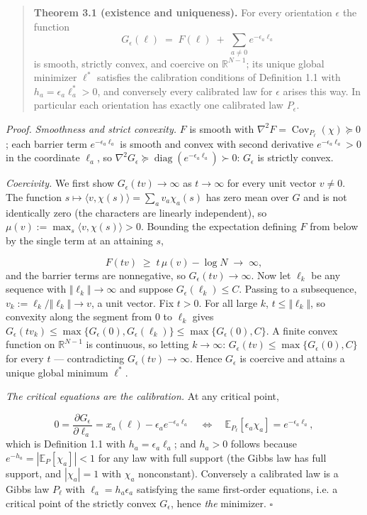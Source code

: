 \documentclass[11pt]{article}
\begin{document}
\begin{quote}
\textbf{Theorem 3.1 (existence and uniqueness).}  For every orientation $\epsilon$ the function
\[
G_\epsilon(\ell) \;=\; F(\ell) \;+\; \sum_{a \ne 0}
e^{-\epsilon_a \ell_a}
\]
is smooth, strictly convex, and coercive on $\mathbb{R}^{N-1}$; its unique global minimizer $\ell^\ast$ satisfies the calibration conditions of Definition 1.1 with $h_a = \epsilon_a\ell^\ast_a > 0$, and conversely every calibrated law for $\epsilon$ arises this way. In particular each orientation has exactly one calibrated law $P_\epsilon$.
\end{quote}
\emph{Proof.}  \emph{Smoothness and strict convexity.}  $F$ is smooth with $\nabla^2 F = \operatorname{Cov}_{P_\ell}(\chi) \succeq 0$; each barrier term $e^{-\epsilon_a\ell_a}$ is smooth and convex with second derivative $e^{-\epsilon_a\ell_a} > 0$ in the coordinate $\ell_a$, so $\nabla^2 G_\epsilon \succeq \operatorname{diag}(e^{-\epsilon_a \ell_a}) \succ 0$: $G_\epsilon$ is strictly convex.

\emph{Coercivity.}  We first show $G_\epsilon(t v) \to \infty$ as $t \to \infty$ for every unit vector $v \ne 0$.  The function $s \mapsto \langle v, \chi(s)\rangle = \sum_a v_a\chi_a(s)$ has zero mean over $G$ and is not identically zero (the characters are linearly independent), so $\mu(v) := \max_s \langle v, \chi(s)\rangle > 0$. Bounding the expectation defining $F$ from below by the single term at an attaining $s$,

\[
F(tv) \;\ge\; t\,\mu(v) - \log N \;\longrightarrow\; \infty ,
\]
and the barrier terms are nonnegative, so $G_\epsilon(tv) \to \infty$.  Now let $\ell_k$ be any sequence with $\Vert\ell_k\Vert \to \infty$ and suppose $G_\epsilon(\ell_k) \le C$.  Passing to a subsequence, $v_k := \ell_k/\Vert\ell_k\Vert \to v$, a unit vector. Fix $t > 0$.  For all large $k$, $t \le \Vert\ell_k\Vert$, so convexity along the segment from $0$ to $\ell_k$ gives $G_\epsilon(t v_k) \le \max\{G_\epsilon(0), G_\epsilon(\ell_k)\} \le \max\{G_\epsilon(0), C\}$.  A finite convex function on $\mathbb{R}^{N-1}$ is continuous, so letting $k \to \infty$: $G_\epsilon(tv) \le \max\{G_\epsilon(0), C\}$ for every $t$ — contradicting $G_\epsilon(tv) \to \infty$.  Hence $G_\epsilon$ is coercive and attains a unique global minimum $\ell^\ast$.

\emph{The critical equations are the calibration.}  At any critical point,

\[
0 = \frac{\partial G_\epsilon}{\partial \ell_a}
= x_a(\ell) - \epsilon_a e^{-\epsilon_a\ell_a}
\quad\Longleftrightarrow\quad
\mathbb{E}_{P_\ell}[\epsilon_a\chi_a] = e^{-\epsilon_a \ell_a} ,
\]
which is Definition 1.1 with $h_a = \epsilon_a\ell_a$; and $h_a > 0$ follows because $e^{-h_a} = |\mathbb{E}_{P}[\chi_a]| < 1$ for any law with full support (the Gibbs law has full support, and $|\chi_a| = 1$ with $\chi_a$ nonconstant).  Conversely a calibrated law is a Gibbs law $P_\ell$ with $\ell_a = h_a\epsilon_a$ satisfying the same first-order equations, i.e. a critical point of the strictly convex $G_\epsilon$, hence \emph{the} minimizer.  $\square$
\end{document}
